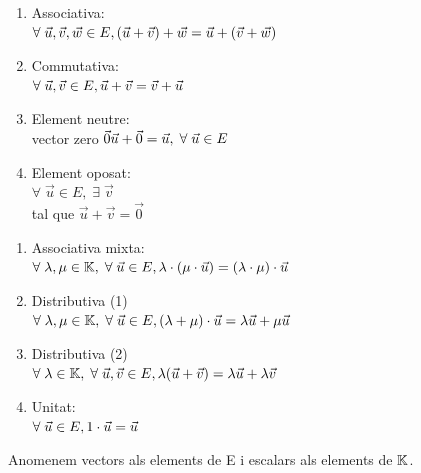 \documentclass[a4paper, 11pt]{article}
\begin{document}
\begin{multicols}{2}
	\begin{enumerate}[$\bullet$]
		\item Associativa: \\
		$\forall \; \vec{u}, \vec{v}, \vec{w} \in E, \\
		(\vec{u} + \vec{v}) + \vec{w} = \vec{u} + (\vec{v} + \vec{w})$
		\item Commutativa: \\
		$ \forall \; \vec{u}, \vec{v} \in E, \\
		\vec{u} + \vec{v} = \vec{v} + \vec{u}$
		\item Element neutre: \\
		vector zero $\vec{0} \\
		\vec{u} + \vec{0} = \vec{u}, \; \forall \; \vec{u} \in E$
		\item Element oposat: \\
		$\forall \; \vec{u} \in E, \;  \exists \; \vec{v}$ \\
		tal que $\vec{u} + \vec{v} = \vec{0}$
	\end{enumerate}

\columnbreak

	\begin{enumerate}[$\bullet$]
		\item Associativa mixta: \\
		$\forall \; \lambda, \mu \in \mathbb{K}, \; \forall \; \vec{u} \in E, \\
		\lambda \cdot (\mu \cdot \vec{u}) = (\lambda \cdot \mu) \cdot \vec{u}$
		\item Distributiva (1) \\
		$\forall \; \lambda, \mu \in \mathbb{K}, \; \forall \; \vec{u} \in E, \\
		(\lambda + \mu) \cdot \vec{u} = \lambda \vec{u} + \mu \vec{u}$
		\item Distributiva (2) \\
		$\forall \; \lambda \in \mathbb{K}, \; \forall \; \vec{u}, \vec{v} \in E, \\
		\lambda(\vec{u}+\vec{v}) = \lambda \vec{u} + \lambda \vec{v}$
		\item Unitat: \\
		$\forall \; \vec{u} \in E, \\
		1 \cdot \vec{u} = \vec{u}$
	\end{enumerate}
\end{multicols}
Anomenem vectors als elements de E i escalars als elements de $\mathbb{K}$.
\end{document}
